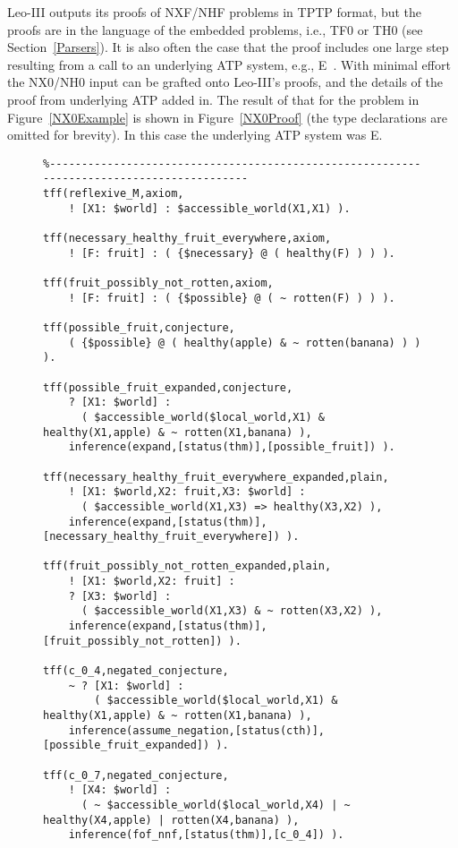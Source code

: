 \documentclass{ceurart}
\begin{document}
Leo-III outputs its proofs of NXF/NHF problems in TPTP format, but the proofs are in the language 
of the embedded problems, i.e., TF0 or TH0 (see Section~\ref{Parsers}).
It is also often the case that the proof includes one large step resulting from a call to an 
underlying ATP system, e.g., E~\cite{SCV19}.
With minimal effort the NX0/NH0 input can be grafted onto Leo-III's proofs, and the details of
the proof from underlying ATP added in.
The result of that for the problem in Figure~\ref{NX0Example} is shown in Figure~\ref{NX0Proof} 
(the type declarations are omitted for brevity).
In this case the underlying ATP system was E.

\begin{figure}[h!]
\centering
{\footnotesize
{\setlength{\baselineskip}{3mm}
\begin{verbatim}
%------------------------------------------------------------------------------------------
tff(reflexive_M,axiom,
    ! [X1: $world] : $accessible_world(X1,X1) ).

tff(necessary_healthy_fruit_everywhere,axiom,
    ! [F: fruit] : ( {$necessary} @ ( healthy(F) ) ) ).

tff(fruit_possibly_not_rotten,axiom,
    ! [F: fruit] : ( {$possible} @ ( ~ rotten(F) ) ) ).

tff(possible_fruit,conjecture,
    ( {$possible} @ ( healthy(apple) & ~ rotten(banana) ) ) ).

tff(possible_fruit_expanded,conjecture,
    ? [X1: $world] :
      ( $accessible_world($local_world,X1) & healthy(X1,apple) & ~ rotten(X1,banana) ),
    inference(expand,[status(thm)],[possible_fruit]) ).

tff(necessary_healthy_fruit_everywhere_expanded,plain,
    ! [X1: $world,X2: fruit,X3: $world] :
      ( $accessible_world(X1,X3) => healthy(X3,X2) ),
    inference(expand,[status(thm)],[necessary_healthy_fruit_everywhere]) ).

tff(fruit_possibly_not_rotten_expanded,plain,
    ! [X1: $world,X2: fruit] :
    ? [X3: $world] :
      ( $accessible_world(X1,X3) & ~ rotten(X3,X2) ),
    inference(expand,[status(thm)],[fruit_possibly_not_rotten]) ).

tff(c_0_4,negated_conjecture,
    ~ ? [X1: $world] :
        ( $accessible_world($local_world,X1) & healthy(X1,apple) & ~ rotten(X1,banana) ),
    inference(assume_negation,[status(cth)],[possible_fruit_expanded]) ).

tff(c_0_7,negated_conjecture,
    ! [X4: $world] :
      ( ~ $accessible_world($local_world,X4) | ~ healthy(X4,apple) | rotten(X4,banana) ),
    inference(fof_nnf,[status(thm)],[c_0_4]) ).


\end{verbatim}}}
\end{figure}
\end{document}
